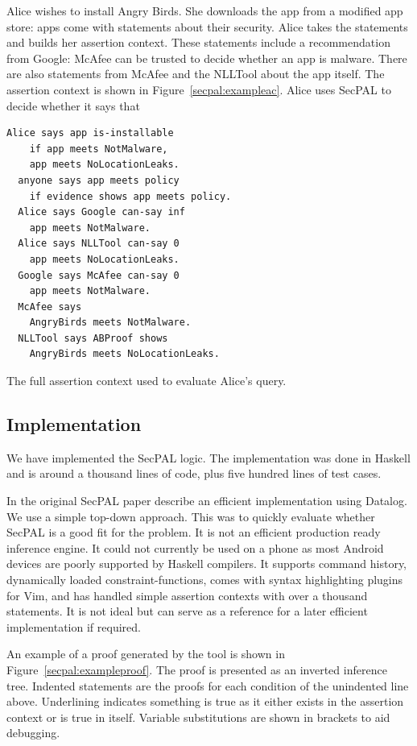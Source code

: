 \documentclass[a4paper,sfsidenotes]{tufte-book}
\begin{document}
Alice wishes to install Angry Birds. She downloads the app from a
modified app store: apps come with statements about their security.  Alice
takes the statements  and builds her assertion context.  These
statements include a recommendation from Google: McAfee can be trusted to
decide whether an app is malware. There are also statements from McAfee
and the NLLTool about the app itself. The assertion context is shown in
Figure~\ref{secpal:exampleac}.
Alice uses SecPAL to decide whether it says
that 

\begin{marginfigure}\label{secpal:exampleac}
\begin{lstlisting}[language=SecPAL]
  Alice says app is-installable 
    if app meets NotMalware, 
    app meets NoLocationLeaks.
  anyone says app meets policy 
    if evidence shows app meets policy.
  Alice says Google can-say inf 
    app meets NotMalware.
  Alice says NLLTool can-say 0 
    app meets NoLocationLeaks.
  Google says McAfee can-say 0 
    app meets NotMalware.
  McAfee says 
    AngryBirds meets NotMalware.
  NLLTool says ABProof shows 
    AngryBirds meets NoLocationLeaks.
\end{lstlisting}
\caption{The full assertion context used to evaluate Alice's query.}
\end{marginfigure}

\subsection{Implementation}

We have implemented the SecPAL logic.
The implementation was done in Haskell and is around a
thousand lines of code, plus five hundred lines of test cases.

In the original SecPAL paper\cite{Becker:2010vh}
\citeauthor*{Becker:2010vh} describe an efficient implementation using Datalog.
We use a simple top-down approach.
This was to quickly evaluate whether SecPAL is a good fit for
the problem. It is not an efficient production ready inference
engine.  It could not currently be used on a phone as most Android devices
 are poorly supported by Haskell compilers.
It supports command history, dynamically loaded constraint-functions,
comes with syntax highlighting plugins for Vim, and has handled simple assertion
contexts with over a thousand statements. It is not ideal but can serve as
a reference for a later efficient implementation if required.

An example of a proof generated by the tool is shown in
Figure~\ref{secpal:exampleproof}.  The proof is presented as an inverted
inference tree. Indented statements are the proofs for each condition of
the unindented line above.  Underlining indicates something is  true
as it either exists in the assertion context or is true in itself. Variable
substitutions are shown in brackets to aid debugging.
\end{document}
